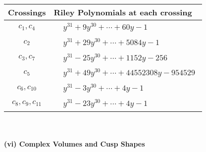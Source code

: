 \documentclass[1p]{elsarticle_modified}
\theoremstyle{definition}
\begin{document}
\begin{tabular}{m{50pt}|m{274pt}}
Crossings & \hspace{64pt}Riley Polynomials at each crossing \\
\hline $$\begin{aligned}c_{1},c_{4}\end{aligned}$$&$\begin{aligned}
&y^{31}+9 y^{30}+\cdots+60 y-1
\end{aligned}$\\
\hline $$\begin{aligned}c_{2}\end{aligned}$$&$\begin{aligned}
&y^{31}+29 y^{30}+\cdots+5084 y-1
\end{aligned}$\\
\hline $$\begin{aligned}c_{3},c_{7}\end{aligned}$$&$\begin{aligned}
&y^{31}-25 y^{30}+\cdots+1152 y-256
\end{aligned}$\\
\hline $$\begin{aligned}c_{5}\end{aligned}$$&$\begin{aligned}
&y^{31}+49 y^{30}+\cdots+44552308 y-954529
\end{aligned}$\\
\hline $$\begin{aligned}c_{6},c_{10}\end{aligned}$$&$\begin{aligned}
&y^{31}-3 y^{30}+\cdots+4 y-1
\end{aligned}$\\
\hline $$\begin{aligned}c_{8},c_{9},c_{11}\end{aligned}$$&$\begin{aligned}
&y^{31}-23 y^{30}+\cdots+4 y-1
\end{aligned}$\\
\hline
\end{tabular}\\~\\
\newpage\flushleft \textbf{(vi) Complex Volumes and Cusp Shapes}
\end{document}
